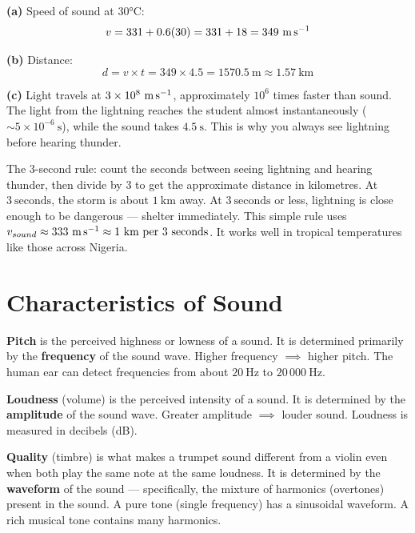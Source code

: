 \begin{solutionbox}
\textbf{(a)} Speed of sound at $30°\text{C}$:
\[
  v = 331 + 0.6(30) = 331 + 18 = 349\ \text{m\,s}^{-1}
\]

\textbf{(b)} Distance:
\[
  d = v \times t = 349 \times 4.5
  = 1570.5\ \text{m} \approx 1.57\ \text{km}
\]

\textbf{(c)} Light travels at $3\times10^8\ \text{m\,s}^{-1}$,
approximately $10^6$ times faster than sound. The light from
the lightning reaches the student almost instantaneously
($\sim 5\times10^{-6}\ \text{s}$), while the sound
takes $4.5\ \text{s}$. This is why you always see
lightning before hearing thunder.

\begin{realworldbox}
The $3$-second rule: count the seconds between seeing
lightning and hearing thunder, then divide by $3$ to
get the approximate distance in kilometres. At
$3\ \text{seconds}$, the storm is about $1\ \text{km}$
away. At $3\ \text{seconds}$ or less, lightning is close
enough to be dangerous --- shelter immediately. This
simple rule uses $v_{sound} \approx 333\ \text{m\,s}^{-1}
\approx 1\ \text{km per 3 seconds}$. It works well in
tropical temperatures like those across Nigeria.
\end{realworldbox}
\end{solutionbox}

\section{Characteristics of Sound}

\begin{defbox}
\textbf{Pitch} is the perceived highness or lowness
of a sound. It is determined primarily by the
\textbf{frequency} of the sound wave.
Higher frequency $\implies$ higher pitch.
The human ear can detect frequencies from about
$20\ \text{Hz}$ to $20\,000\ \text{Hz}$.

\textbf{Loudness} (volume) is the perceived intensity
of a sound. It is determined by the \textbf{amplitude}
of the sound wave. Greater amplitude $\implies$ louder
sound. Loudness is measured in decibels (dB).

\textbf{Quality} (timbre) is what makes a trumpet
sound different from a violin even when both play the
same note at the same loudness. It is determined by
the \textbf{waveform} of the sound --- specifically,
the mixture of harmonics (overtones) present in the
sound. A pure tone (single frequency) has a sinusoidal
waveform. A rich musical tone contains many harmonics.
\end{defbox}

